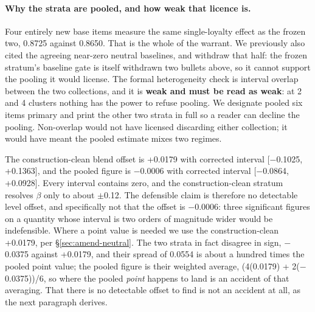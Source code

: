 \documentclass{article}
\providecommand{\textminus}{\ensuremath{-}}
\begin{document}
\paragraph{Why the strata are pooled, and how weak that licence is.} Four entirely
  new base items measure the same single-loyalty effect as the frozen two,
  0.8725 against 0.8650. That is the whole of the warrant. We previously
  also cited the agreeing near-zero neutral baselines, and withdraw that half:
  the frozen stratum's baseline gate is itself withdrawn two bullets above, so
  it cannot support the pooling it would license. The formal
  heterogeneity check is interval overlap between the two collections, and it is
  \textbf{weak and must be read as weak}: at 2 and 4 clusters nothing has the
  power to refuse pooling. We designate pooled six items primary and print the
  other two strata in full so a reader can decline the pooling. Non-overlap
  would not have licensed discarding either collection; it would have meant the
  pooled estimate mixes two regimes.

The construction-clean blend offset is +0.0179 with corrected interval
[\textminus 0.1025, +0.1363], and the pooled figure is \textminus 0.0006 with corrected interval
[\textminus 0.0864, +0.0928]. Every interval contains zero, and the construction-clean
stratum resolves $\beta$ only to about $\pm$0.12. The defensible claim is
therefore no detectable level offset, and specifically not that the offset is
\textminus 0.0006: three significant figures on a quantity whose interval is two orders
of magnitude wider would be indefensible. Where a point value is needed we use
the construction-clean +0.0179, per \S\ref{sec:amend-neutral}. The two strata
in fact disagree in sign, \textminus 0.0375 against +0.0179, and their spread of
0.0554 is about a hundred times the pooled point value; the pooled figure is
their weighted average, (4(0.0179) + 2(\textminus 0.0375))/6, so where the pooled
\emph{point} happens to land is an accident of that averaging. That there is no
detectable offset to find is not an accident at all, as the next paragraph
derives.
\end{document}
